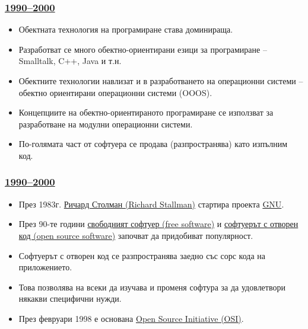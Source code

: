 \documentclass[ignorenonframetext, hyperref=unicode]{beamer}
\begin{document}
\begin{frame}
\frametitle{\href{http://en.wikipedia.org/wiki/History_of_computing_hardware_(1960s-present)}{
1990--2000}}
\begin{itemize}
  \item Обектната технология на програмиране става доминираща.
  \item Разработват се много обектно-ориентирани езици за програмиране --
  Smalltalk, C++, Java и т.н.
  \item Обектните технологии навлизат и в разработването на операционни системи
  -- обектно ориентирани операционни системи (OOOS).
  \item Концепциите на обектно-ориентираното програмиране се използват за
  разработване на модулни операционни системи.
  \item По-голямата част от софтуера се продава (разпространява) като изпълним
  код. 
\end{itemize}
\end{frame}


\begin{frame}
\frametitle{\href{http://en.wikipedia.org/wiki/History_of_computing_hardware_(1960s-present)}{
1990--2000}}
\begin{itemize}
  \item  През 1983г. 
  \href{http://en.wikipedia.org/wiki/Richard_Stallman}{Ричард Столман
  (Richard Stallman)}  стартира проекта \href{http://en.wikipedia.org/wiki/GNU}{GNU}.
\item През 90-те години
\href{http://en.wikipedia.org/wiki/Free_software_movement}{свободният
софтуер (free software)} и
\href{http://en.wikipedia.org/wiki/Open_Source_history}{софтуерът с
отворен код (open source software)} започват да придобиват популярност. 
\item Софтуерът с отворен код се разпространява заедно със сорс кода на
приложението. 
\item Това позволява на всеки да изучава и променя софтура за да удовлетвори
някакви специфични нужди.
\item През февруари 1998 е основана
\href{http://en.wikipedia.org/wiki/Open_Source_history}{Open Source Initiative (OSI)}.
\end{itemize}
\end{frame}
\end{document}
